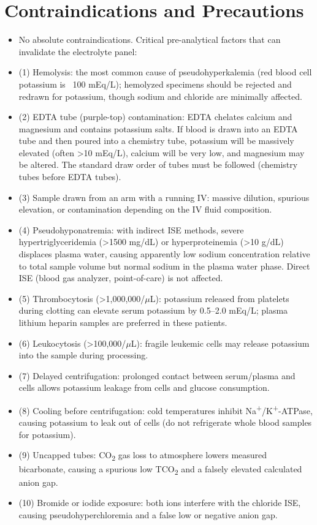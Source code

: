 \section*{Contraindications and Precautions}
\begin{itemize}
  \item No absolute contraindications. Critical pre-analytical factors that can invalidate the electrolyte panel:
  \item (1) Hemolysis: the most common cause of pseudohyperkalemia (red blood cell potassium is ~100 mEq/L); hemolyzed specimens should be rejected and redrawn for potassium, though sodium and chloride are minimally affected.
  \item (2) EDTA tube (purple-top) contamination: EDTA chelates calcium and magnesium and contains potassium salts. If blood is drawn into an EDTA tube and then poured into a chemistry tube, potassium will be massively elevated (often >10 mEq/L), calcium will be very low, and magnesium may be altered. The standard draw order of tubes must be followed (chemistry tubes before EDTA tubes).
  \item (3) Sample drawn from an arm with a running IV: massive dilution, spurious elevation, or contamination depending on the IV fluid composition.
  \item (4) Pseudohyponatremia: with indirect ISE methods, severe hypertriglyceridemia (>1500 mg/dL) or hyperproteinemia (>10 g/dL) displaces plasma water, causing apparently low sodium concentration relative to total sample volume but normal sodium in the plasma water phase. Direct ISE (blood gas analyzer, point-of-care) is not affected.
  \item (5) Thrombocytosis (>1,000,000/$\mu$L): potassium released from platelets during clotting can elevate serum potassium by 0.5--2.0 mEq/L; plasma lithium heparin samples are preferred in these patients.
  \item (6) Leukocytosis (>100,000/$\mu$L): fragile leukemic cells may release potassium into the sample during processing.
  \item (7) Delayed centrifugation: prolonged contact between serum/plasma and cells allows potassium leakage from cells and glucose consumption.
  \item (8) Cooling before centrifugation: cold temperatures inhibit Na\textsuperscript{+}/K\textsuperscript{+}-ATPase, causing potassium to leak out of cells (do not refrigerate whole blood samples for potassium).
  \item (9) Uncapped tubes: CO\textsubscript{2} gas loss to atmosphere lowers measured bicarbonate, causing a spurious low TCO\textsubscript{2} and a falsely elevated calculated anion gap.
  \item (10) Bromide or iodide exposure: both ions interfere with the chloride ISE, causing pseudohyperchloremia and a false low or negative anion gap.
\end{itemize}

